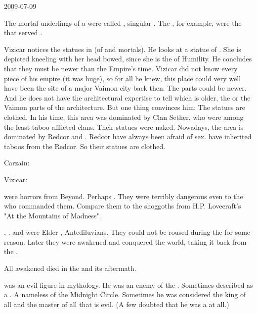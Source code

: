 2009-07-09

The mortal underlings of a \resphan \dynasty were called \hedrim, singular \hedor. 
The \hedrim[\Mystraacht], for example, were the \hedrim that served \Mystraacht. 


Vizicar notices the statues in \Forklin (of \sephiroth and mortals). 
He looks at a statue of \Feazirah. 
She is depicted kneeling with her head bowed, since she is the \sephirah of Humility.
He concludes that they must be newer than the Empire's time. 
Vizicar did not know every piece of his empire (it was huge), so for all he knew, this place could very well have been the site of a major Vaimon city back then. 
The \Ortaican parts could be newer. 
And he does not have the architectural expertise to tell which is older, the \Ortaican or the Vaimon parts of the architecture. 
But one thing convinces him: 
The statues are clothed. 
In his time, this area was dominated by Clan Sether, who were among the least taboo-afflicted clans.
Their statues were naked. 
Nowadays, the area is dominated by Redcor and \Telcra.
Redcor have always been afraid of sex. 
\Telcra have inherited taboos from the Redcor. 
So their statues are clothed. 

\begin{prose}
  Carzain: 
  
  Vizicar:
\end{prose}


\Ghobaleth were horrors from Beyond. 
Perhaps . 
They were terribly dangerous even to the \banes who commanded them.
Compare them to the shoggoths from H.P. Lovecraft's "At the Mountains of Madness". 


\Nexagglachel, \Ishnaruchaefir, and \Secherdamon were Elder \Dragons, Antediluvians. 
They could not be roused during the \firstbanewar for some reason. 
Later they were awakened and conquered the world, taking it back from the \aryothim. 


All awakened \dragons died in the \firstbanewar and its aftermath.


\Isphet was an evil figure in \Iquinian mythology. 
He was an enemy of the \sephiroth. 
Sometimes described as a \qliphah. 
A nameless \qliphah of the Midnight Circle. 
Sometimes he was considered the king of all \qliphoth and the master of all that is evil. 
(A few doubted that he was a \qliphah at all.)

